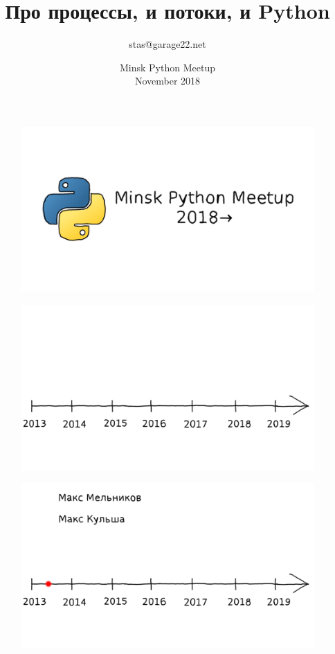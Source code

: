 \documentclass[10pt,pdf,utf8,aspectratio=169,xcolor=dvipsnames,x11names,center]{beamer}
\title[Remote]{\Large{Про процессы, и потоки, и Python}}
\author[]{stas@garage22.net}
\date{Minsk Python Meetup\\November 2018}
\begin{document}
\begin{frame}
  \begin{figure}
    \includegraphics[scale=0.88]{Slides-01-title}
  \end{figure}
\end{frame}

\begin{frame}
  \begin{figure}
    \includegraphics[scale=0.88]{Slides-02-01}
  \end{figure}
\end{frame}

\begin{frame}
  \begin{figure}
    \includegraphics[scale=0.88]{Slides-02-02}
  \end{figure}
\end{frame}
\end{document}
